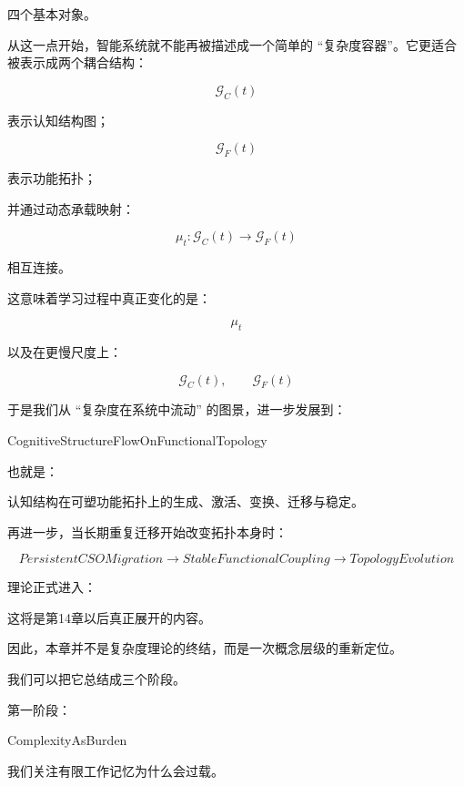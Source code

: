 四个基本对象。

从这一点开始，智能系统就不能再被描述成一个简单的 ``复杂度容器''。它更适合被表示成两个耦合结构：

\[
\mathcal G_C(t)
\]

表示认知结构图；

\[
\mathcal G_F(t)
\]

表示功能拓扑；

并通过动态承载映射：

\[
\mu_t:
\mathcal G_C(t)
\rightarrow
\mathcal G_F(t)
\]

相互连接。

这意味着学习过程中真正变化的是：

\[
\boxed{
\mu_t
}
\]

以及在更慢尺度上：

\[
\boxed{
\mathcal G_C(t),\qquad
\mathcal G_F(t)
}
\]

于是我们从 ``复杂度在系统中流动'' 的图景，进一步发展到：

\begin{statementbox}
CognitiveStructureFlowOnFunctionalTopology
\end{statementbox}

也就是：

\begin{statementbox}
认知结构在可塑功能拓扑上的生成、激活、变换、迁移与稳定。
\end{statementbox}

再进一步，当长期重复迁移开始改变拓扑本身时：

\[
PersistentCSOMigration
\rightarrow
StableFunctionalCoupling
\rightarrow
TopologyEvolution
\]

理论正式进入：

\begin{statementbox}
\centering
{}
\end{statementbox}

这将是第14章以后真正展开的内容。

因此，本章并不是复杂度理论的终结，而是一次概念层级的重新定位。

我们可以把它总结成三个阶段。

第一阶段：

\begin{statementbox}
ComplexityAsBurden
\end{statementbox}

我们关注有限工作记忆为什么会过载。

